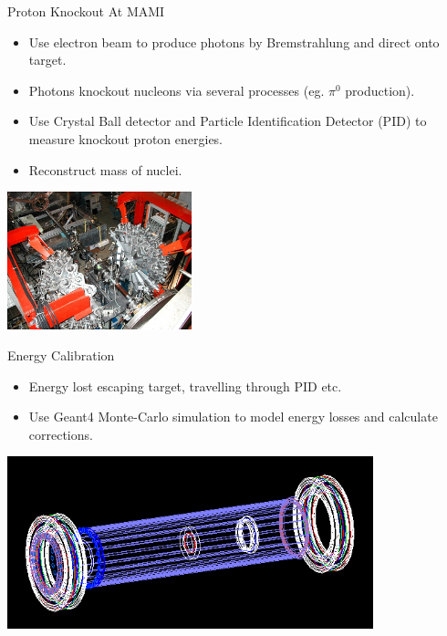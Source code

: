 \documentclass{beamer}
\begin{document}
\begin{frame}{Proton Knockout At MAMI}
\begin{itemize}
    \item Use electron beam to produce photons by Bremstrahlung and direct onto target.
    \item Photons knockout nucleons via several processes (eg. $\pi^{0}$ production).
    \item Use Crystal Ball detector and Particle Identification Detector (PID) to measure knockout proton energies.
    \item Reconstruct mass of nuclei.
\end{itemize}

    \includegraphics[height = 4cm, right]{openCB}

\end{frame}

\begin{frame}{Energy Calibration}

\begin{itemize}
    \item Energy lost escaping target, travelling through PID etc.
    \item Use Geant4 Monte-Carlo simulation to model energy losses and calculate corrections.
\end{itemize}

    \centering
    \includegraphics[height= 5cm]{AllIn}

\end{frame}
\end{document}
